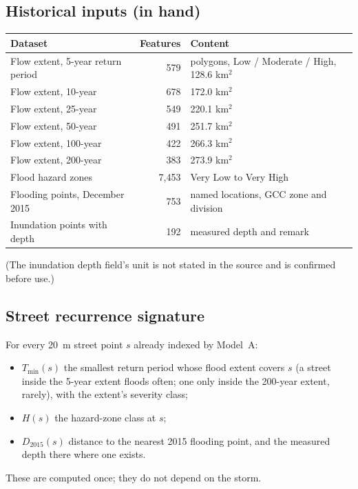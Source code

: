 \documentclass[11pt,a4paper]{article}
\begin{document}
\subsection{Historical inputs (in hand)}
\begin{center}
\begin{tabular}{@{}lrl@{}}
\toprule
Dataset & Features & Content\\
\midrule
Flow extent, 5-year return period & 579 & polygons, Low / Moderate / High, 128.6 km$^2$\\
Flow extent, 10-year & 678 & 172.0 km$^2$\\
Flow extent, 25-year & 549 & 220.1 km$^2$\\
Flow extent, 50-year & 491 & 251.7 km$^2$\\
Flow extent, 100-year & 422 & 266.3 km$^2$\\
Flow extent, 200-year & 383 & 273.9 km$^2$\\
Flood hazard zones & 7,453 & Very Low to Very High\\
Flooding points, December 2015 & 753 & named locations, GCC zone and division\\
Inundation points with depth & 192 & measured depth and remark\\
\bottomrule
\end{tabular}
\end{center}
(The inundation depth field's unit is not stated in the source and is confirmed before
use.)

\subsection{Street recurrence signature}
For every 20~m street point $s$ already indexed by Model~A:
\begin{itemize}
  \item $T_{\min}(s)$ \textendash{} the smallest return period whose flood extent
        covers $s$ (a street inside the 5-year extent floods often; one only inside the
        200-year extent, rarely), with the extent's severity class;
  \item $H(s)$ \textendash{} the hazard-zone class at $s$;
  \item $D_{2015}(s)$ \textendash{} distance to the nearest 2015 flooding point, and
        the measured depth there where one exists.
\end{itemize}
These are computed once; they do not depend on the storm.
\end{document}
